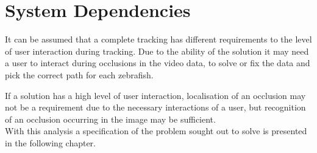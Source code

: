 \section{System Dependencies}\label{sec:int_dep}
It can be assumed that a complete tracking has different requirements to the level of user interaction during tracking. Due to the ability of the solution it may need a user to interact during occlusions in the video data, to solve or fix the data and pick the correct path for each zebrafish.

If a solution has a high level of user interaction, localisation of an occlusion may not be a requirement due to the necessary interactions of a user, but recognition of an occlusion occurring in the image may be sufficient.\\

With this analysis a specification of the problem sought out to solve is presented in the following chapter.
